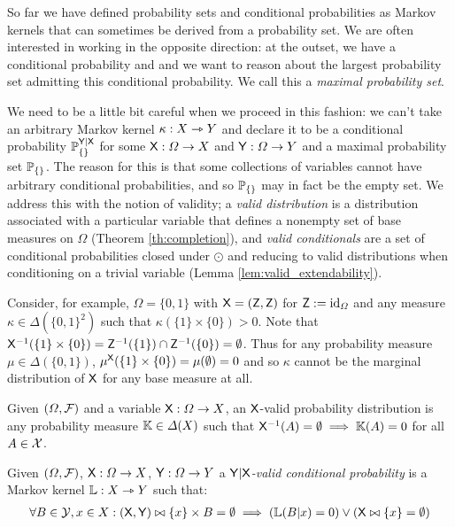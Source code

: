 So far we have defined probability sets and conditional probabilities as Markov kernels that can sometimes be derived from a probability set. We are often interested in working in the opposite direction: at the outset, we have a conditional probability and and we want to reason about the largest probability set admitting this conditional probability. We call this a \emph{maximal probability set}.

We need to be a little bit careful when we proceed in this fashion: we can't take an arbitrary Markov kernel $\kappa:X\rightarrowtriangle Y$ and declare it to be a conditional probability $\mathbb{P}_{\{\}}^{\mathsf{Y}|\mathsf{X}}$ for some $\mathsf{X}:\Omega\to X$ and $\mathsf{Y}:\Omega\to Y$ and a maximal probability set $\mathbb{P}_{\{\}}$. The reason for this is that some collections of variables cannot have arbitrary conditional probabilities, and so $\mathbb{P}_{\{\}}$ may in fact be the empty set. We address this with the notion of validity; a \emph{valid distribution} is a distribution associated with a particular variable that defines a nonempty set of base measures on $\Omega$ (Theorem \ref{th:completion}), and \emph{valid conditionals} are a set of conditional probabilities closed under $\odot$ and reducing to valid distributions when conditioning on a trivial variable (Lemma \ref{lem:valid_extendability}).

Consider, for example, $\Omega=\{0,1\}$ with $\mathsf{X}=(\mathsf{Z},\mathsf{Z})$ for $\mathsf{Z}:=\text{id}_{\Omega}$ and any measure $\kappa\in \Delta(\{0,1\}^2)$ such that $\kappa(\{1\}\times \{0\})>0$. Note that $\mathsf{X}^{-1}(\{1\}\times \{0\})=\mathsf{Z}^{-1}(\{1\})\cap \mathsf{Z}^{-1}(\{0\})=\emptyset$. Thus for any probability measure $\mu\in \Delta(\{0,1\})$, $\mu^{\mathsf{X}}(\{1\}\times \{0\}) = \mu(\emptyset)=0 $ and so $\kappa$ cannot be the marginal distribution of $\mathsf{X}$ for any base measure at all. 

\begin{definition}\label{def:valid_dist}
Given $(\Omega,\mathcal{F})$ and a variable $\mathsf{X}:\Omega\to X$, an $\mathsf{X}$-valid probability distribution is any probability measure $\mathbb{K}\in \Delta(X)$ such that $\mathsf{X}^{-1}(A)=\emptyset\implies \mathbb{K}(A) = 0$ for all $A\in\mathcal{X}$.
\end{definition}

\begin{definition}\label{def:valid_conditional_prob}
Given $(\Omega,\mathcal{F})$, $\mathsf{X}:\Omega\to X$, $\mathsf{Y}:\Omega\to Y$ a \emph{$\mathsf{Y}|\mathsf{X}$-valid conditional probability} is a Markov kernel $\mathbb{L}:X\rightarrowtriangle Y$ such that:
\begin{align}
    \forall B\in \mathcal{Y}, x\in X: (\mathsf{X},\mathsf{Y})\bowtie \{x\}\times B = \emptyset \implies \left(\mathbb{L}(B|x) = 0\right) \lor \left(\mathsf{X}\bowtie \{x\} = \emptyset\right)
\end{align}
\end{definition}

